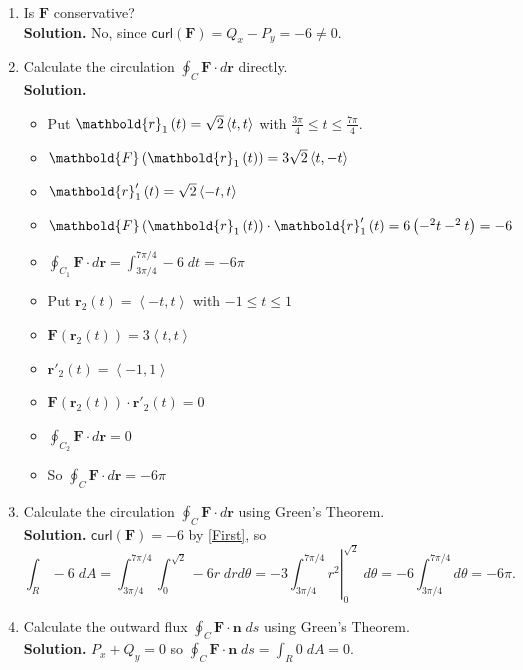 \documentclass[12pt]{article}
\let\cos\relax\DeclareMathOperator{\cos}{\mathsf{cos}}
\let\sin\relax\DeclareMathOperator{\sin}{\mathsf{sin}}
\begin{document}
\begin{enumerate}
\item\label{First} Is $\mathbold{F}$ conservative?\\
{\bf Solution.}
No, since $\mathsf{curl}\left(\mathbold{F}\right)
=Q_x-P_y=-6\ne 0$.
\item Calculate the circulation $\oint_C\mathbold{F}
\cdot d\mathbold{r}$ directly.\\
{\bf Solution.}
\begin{itemize}
\item Put $\mathbold{r}_1\left(t\right)=\sqrt{2}
\left\langle \cos{t},\sin{t}\right\rangle$
with $\frac{3\pi}{4}
\le t\le\frac{7\pi}{4}$.
\item $\mathbold{F}\left(\mathbold{r}_1\left(t\right)\right)
=3\sqrt{2}
\left\langle \sin{t},-\cos{t}\right\rangle$
\item $\mathbold{r}'_1\left(t\right)
=\sqrt{2}\left\langle -\sin{t},\cos{t}\right\rangle$
\item $\mathbold{F}\left(\mathbold{r}_1\left(t\right)\right)
\cdot\mathbold{r}'_1\left(t\right)
=6\left(-\sin^2{t}-\cos^2{t}\right)=-6$
\item $\oint_{C_1}\mathbold{F} \cdot d\mathbold{r}
=\int_{3\pi/4}^{7\pi/4}-6\;dt=-6\pi$
\item Put $\mathbold{r}_2\left(t\right)=
\left\langle -t,t\right\rangle$ with $-1\le t\le 1$
\item $\mathbold{F}\left(\mathbold{r}_2\left(t\right)\right)
=3\left\langle t,t\right\rangle$
\item $\mathbold{r}'_2\left(t\right)
=\left\langle -1,1\right\rangle$
\item $\mathbold{F}\left(\mathbold{r}_2\left(t\right)\right)
\cdot\mathbold{r}'_2\left(t\right)=0$
\item $\oint_{C_2}\mathbold{F} \cdot d\mathbold{r}=0$
\item So $\oint_C\mathbold{F} \cdot d\mathbold{r}=-6\pi$
\end{itemize}
\item Calculate the circulation $\oint_C\mathbold{F}
\cdot d\mathbold{r}$ using Green's Theorem.\\
{\bf Solution.}
$\mathsf{curl}\left(\mathbold{F}\right)=-6$ by
\autoref{First}, so
\[\int_R-6\;dA=\int_{3\pi/4}^{7\pi/4}\int_0^{\sqrt{2}}-6r
\;drd\theta
=-3\left.\int_{3\pi/4}^{7\pi/4}r^2\right|_0^{\sqrt{2}}\;d\theta
=-6\int_{3\pi/4}^{7\pi/4}d\theta=-6\pi.\]

\item Calculate the outward flux $\oint_C\mathbold{F}
\cdot\mathbold{n}\;ds$ using Green's Theorem.\\
{\bf Solution.}
$P_x+Q_y=0$ so
$\oint_C\mathbold{F}
\cdot\mathbold{n}\;ds=\int_R0\;dA=0$.
\end{enumerate}
\end{document}
